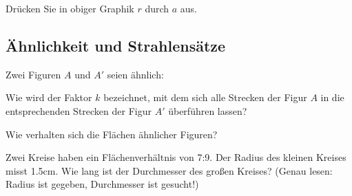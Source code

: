 Drücken Sie in obiger Graphik $r$ durch $a$ aus.



\noTRAINER{\newpage}


\subsection{Ähnlichkeit und Strahlensätze}
Zwei Figuren $A$ und $A'$ seien ähnlich:

Wie wird der Faktor $k$ bezeichnet, mit dem sich alle Strecken der Figur $A$ in die entsprechenden Strecken der Figur $A'$ überführen lassen?

Wie verhalten sich die Flächen ähnlicher Figuren?

Zwei Kreise haben ein Flächenverhältnis von 7:9. Der Radius des
kleinen Kreises misst 1.5cm. Wie lang ist der Durchmesser des großen
Kreises? (Genau lesen: Radius ist gegeben, Durchmesser ist gesucht!)



